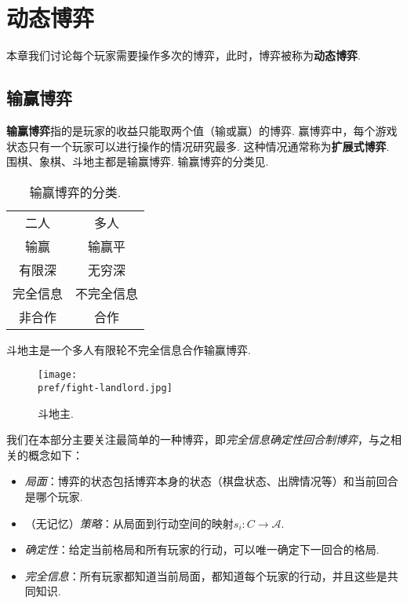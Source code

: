 \chapter{动态博弈}\label{chap:dynamical-game}
\begingroup
\newcommand{\pref}{Chapters/dynamical-game/figures}


本章我们讨论每个玩家需要操作多次的博弈，此时，博弈被称为\textbf{动态博弈}.

\section{输赢博弈}

\textbf{输赢博弈}指的是玩家的收益只能取两个值（输或赢）的博弈. 赢博弈中，每个游戏状态只有一个玩家可以进行操作的情况研究最多. 这种情况通常称为\textbf{扩展式博弈}. 围棋、象棋、斗地主都是输赢博弈. 输赢博弈的分类见.

\begin{table}[ht]
    \centering
    \begin{tabular}{cc}
        二人 & 多人 \\
        输赢 & 输赢平\\
        有限深 & 无穷深 \\
        完全信息 & 不完全信息 \\
        非合作 & 合作
    \end{tabular}
    \caption{输赢博弈的分类.}
    \label{tab:win-lose-game}
\end{table}

\begin{example}
    斗地主是一个多人有限轮不完全信息合作输赢博弈.
\begin{figure}
    \centering
    \texttt{[image: \\pref/fight-landlord.jpg]}
    \caption{斗地主.}
\end{figure}

\end{example}

我们在本部分主要关注最简单的一种博弈，即\emph{完全信息确定性回合制博弈}，与之相关的概念如下：
\begin{itemize}
    \item \emph{局面}：博弈的状态包括博弈本身的状态（棋盘状态、出牌情况等）和当前回合是哪个玩家.
    \item （无记忆）\emph{策略}：从局面到行动空间的映射$s_i:C\to\mathcal A$.
    \item \emph{确定性}：给定当前格局和所有玩家的行动，可以唯一确定下一回合的格局.
    \item  \emph{完全信息}：所有玩家都知道当前局面，都知道每个玩家的行动，并且这些是共同知识.
\end{itemize}

